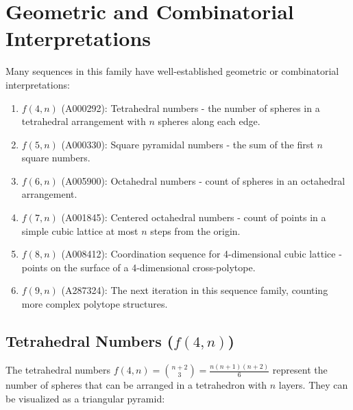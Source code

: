 \documentclass[12pt,a4paper]{article}
\begin{document}
\section{Geometric and Combinatorial Interpretations}

Many sequences in this family have well-established geometric or combinatorial interpretations:

\begin{enumerate}
    \item $f(4,n)$ (A000292): Tetrahedral numbers - the number of spheres in a tetrahedral arrangement with $n$ spheres along each edge.
    
    \item $f(5,n)$ (A000330): Square pyramidal numbers - the sum of the first $n$ square numbers.
    
    \item $f(6,n)$ (A005900): Octahedral numbers - count of spheres in an octahedral arrangement.
    
    \item $f(7,n)$ (A001845): Centered octahedral numbers - count of points in a simple cubic lattice at most $n$ steps from the origin.
    
    \item $f(8,n)$ (A008412): Coordination sequence for 4-dimensional cubic lattice - points on the surface of a 4-dimensional cross-polytope.
    
    \item $f(9,n)$ (A287324): The next iteration in this sequence family, counting more complex polytope structures.
\end{enumerate}

\subsection{Tetrahedral Numbers ($f(4,n)$)}

The tetrahedral numbers $f(4,n) = \binom{n+2}{3} = \frac{n(n+1)(n+2)}{6}$ represent the number of spheres that can be arranged in a tetrahedron with $n$ layers. They can be visualized as a triangular pyramid:

\begin{center}
\end{center}
\end{document}
